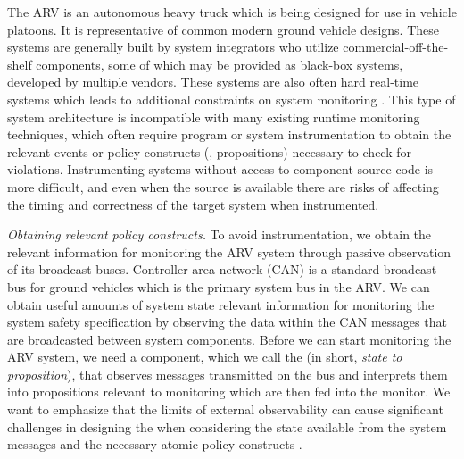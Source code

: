 The ARV is an autonomous heavy truck which is being designed for use in vehicle platoons. It is representative of common modern ground vehicle designs.
These systems are generally built by system integrators who utilize commercial-off-the-shelf  components, some of which may be provided as black-box systems,
developed by multiple vendors.
These systems are also often hard real-time systems which leads to additional constraints on system monitoring \cite{Goodloe2010}.
This type of system architecture is incompatible with many existing runtime monitoring techniques, which often require program or system instrumentation \cite{Havelund2004, Chen2003, Bonakdarpour2012,Kim2004} to obtain the relevant events or policy-constructs (\eg, propositions) necessary to check for violations.
Instrumenting systems without access to component source code is more difficult, and even when the source is available there are risks of affecting the timing and correctness of the target system when instrumented.

\noindent
\textit{Obtaining relevant policy constructs.}
To avoid instrumentation, we obtain the relevant information for monitoring the ARV system through passive observation of
its broadcast buses. %
Controller area network (CAN) is a
standard broadcast bus for ground vehicles which is the primary system bus in the ARV. We can obtain useful amounts of system state relevant information for monitoring
the system safety specification by observing the data within the CAN messages that are broadcasted between system components.
Before we can start monitoring the ARV system, we need a component, which we call the \sfmap (in short, \emph{state to proposition}), that observes messages transmitted on the bus and interprets
them into propositions relevant to monitoring which are then fed into the monitor.
We want to emphasize that the limits of external observability can cause significant challenges
in designing the \sfmap when considering the state available from the system messages and
the necessary atomic policy-constructs \cite{Kane2014}.

